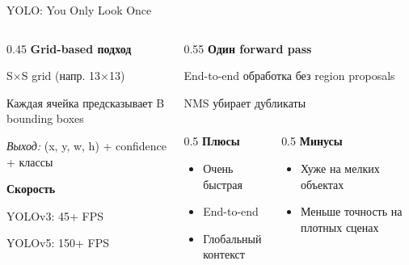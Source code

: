 \documentclass[aspectratio=169, 9pt]{beamer}
\begin{document}
\begin{frame}{YOLO: You Only Look Once}
\begin{columns}[T]
\begin{column}{0.45\textwidth}
{\bfseries\textcolor{blue!70}{Grid-based подход}}

{\small S$\times$S grid (напр. 13$\times$13)}

{\small Каждая ячейка предсказывает B bounding boxes}

\vspace{0.3em}
{\small\textit{Выход:} (x, y, w, h) + confidence + классы}

\vspace{0.4em}
{\bfseries\textcolor{green!50!black}{Скорость}}

{\small YOLOv3: 45+ FPS}

{\small YOLOv5: 150+ FPS}
\end{column}

\begin{column}{0.55\textwidth}
{\bfseries\textcolor{blue!70}{Один forward pass}}

{\small End-to-end обработка без region proposals}

{\small NMS убирает дубликаты}

\vspace{0.3em}
\begin{columns}[T]
\begin{column}{0.5\textwidth}
{\small\textbf{\textcolor{blue!70}{Плюсы}}}
{\small
\begin{itemize}
    \item Очень быстрая
    \item End-to-end
    \item Глобальный контекст
\end{itemize}
}
\end{column}

\begin{column}{0.5\textwidth}
{\small\textbf{\textcolor{green!50!black}{Минусы}}}
{\small
\begin{itemize}
    \item Хуже на мелких объектах
    \item Меньше точность на плотных сценах
\end{itemize}
}
\end{column}
\end{columns}
\end{column}
\end{columns}
\end{frame}
\end{document}
